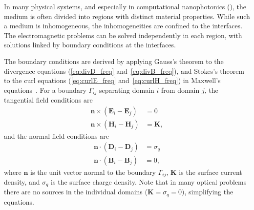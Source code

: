     In many physical systems, and especially in computational nanophotonics
    (), the medium is often divided into regions with distinct
    material properties. While such a medium is inhomogeneous, the inhomogeneities
    are confined to the interfaces. The electromagnetic problems can be solved
    independently in each region, with solutions linked by boundary conditions at
    the interfaces.
    
    The boundary conditions are derived by applying Gauss's theorem to
     the divergence equations (\eqref{eq:divD_freq} and~\eqref{eq:divB_freq}), and Stokes's
      theorem to the curl equations (\eqref{eq:curlE_freq} and~\eqref{eq:curlH_freq}) in
       Maxwell's equations~\cite{novotny}.
       For a boundary $\Gamma_{ij}$ separating domain
$i$ from domain $j$, the tangential field conditions are~\cite{novotny}
    \begin{align}
        \mathbf{n} \times (\mathbf{E}_i - \mathbf{E}_j) & = 0 \label{eq:BC_E} \\
        \mathbf{n} \times (\mathbf{H}_i - \mathbf{H}_j) & = \mathbf{K} ,
        \label{eq:BC_H}
    \end{align}
    and the normal field conditions are
    \begin{align}
        \mathbf{n} \cdot (\mathbf{D}_i - \mathbf{D}_j) & = \sigma_q \label{eq:BC_D} \\
        \mathbf{n} \cdot (\mathbf{B}_i - \mathbf{B}_j) & = 0, \label{eq:BC_B}
    \end{align}
    where $\mathbf{n}$ is the unit vector normal to the boundary $\Gamma_{ij}$, $\mathbf{K}$ is the
    surface current density,
    and $\sigma_q$ is the surface charge density. Note that in many optical problems
    there are no
    sources in the individual domains ($\mathbf{K}=\sigma_q=0)$, simplifying the
    equations.

%

